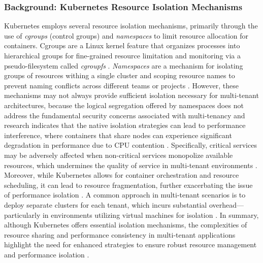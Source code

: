 \documentclass[11pt, a4paper, oneside, listof=totoc]{scrartcl}
\begin{document}
            \subsubsection{Background: Kubernetes Resource Isolation Mechanisms}\label{subsubsec:k8sResourceIsolation}
                Kubernetes employs several resource isolation mechanisms, primarily through the use
                of \textit{cgroups} (control groups) and \textit{namespaces} to limit resource
                allocation for containers.
                Cgroups are a Linux kernel feature that organizes processes into hierarchical
                groups for fine-grained resource limitation and monitoring via a pseudo-filesystem
                called \textit{cgroupfs} \parencites{kubernetesCgroupsV2}{cgroups7}.
                \textit{Namespaces} are a mechanism for isolating groups of resources withing a
                single cluster and scoping resource names to prevent naming conflicts across
                different teams or projects \parencite{kubernetesNamespaces}.
                However, these mechanisms may not always provide sufficient isolation necessary for
                multi-tenant architectures, because the logical segregation offered by namespaces
                does not address the fundamental security concerns associated with multi-tenancy 
                \parencite[p.~651]{nguyen2022} and research indicates that the native isolation
                strategies can lead to performance interference, where containers that share nodes
                can experience significant degradation in performance due to CPU contention
                \parencite[p.~158]{kim2021}.
                Specifically, critical services may be adversely affected when non-critical services
                monopolize available resources, which undermines the quality of service in
                multi-tenant environments \parencite[p.~30410]{li2019}.
                \\
                Moreover, while Kubernetes allows for container orchestration and resource
                scheduling, it can lead to resource fragmentation, further exacerbating the issue
                of performance isolation \parencite[p.~1]{jian2023}.
                A common approach in multi-tenant scenarios is to deploy separate clusters for each
                tenant, which incurs substantial overhead—particularly in environments utilizing
                virtual machines for isolation \parencite[pp.~144574--144575]{senel2023}.
                In summary, although Kubernetes offers essential isolation mechanisms, the
                complexities of resource sharing and performance consistency in multi-tenant
                applications highlight the need for enhanced strategies to ensure robust resource
                management and performance isolation
                \parencites[p.~651]{nguyen2022}[p.~2]{jian2023}[p.~158]{kim2021}.
\end{document}
